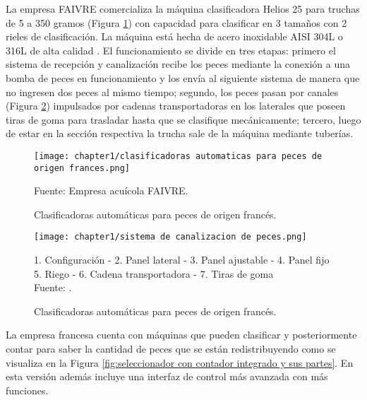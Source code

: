 La empresa FAIVRE comercializa la máquina clasificadora Helios 25 para truchas de 5 a 350 gramos (Figura \ref{fig:clasificadoras automaticas para peces de origen frances}) con capacidad para clasificar en 3 tamaños con 2 rieles de clasificación. La máquina está hecha de acero inoxidable AISI 304L o 316L de alta calidad \citep[p.~1]{FAIVRE2019a}. El funcionamiento se divide en tres etapas: primero el sistema de recepción y canalización recibe los peces mediante la conexión a una bomba de peces en funcionamiento y los envía al siguiente sistema de manera que no ingresen dos peces al mismo tiempo; segundo, los peces pasan por canales (Figura \ref{fig:sistema de canalizacion de peces}) impulsados por cadenas transportadoras en los laterales que poseen tiras de goma para trasladar hasta que se clasifique mecánicamente; tercero, luego de estar en la sección respectiva la trucha sale de la máquina mediante tuberías.

\begin{figure}[H]
	\centering
	\texttt{[image: chapter1/clasificadoras automaticas para peces de origen frances.png]}
	\caption{Clasificadoras automáticas para peces de origen francés.}
	\begin{myflushleftportland}		
		Fuente: Empresa acuícola FAIVRE.
	\end{myflushleftportland}
	\label{fig:clasificadoras automaticas para peces de origen frances}
\end{figure}

\begin{figure}[H]
	\centering
	\texttt{[image: chapter1/sistema de canalizacion de peces.png]}
	\caption{Clasificadoras automáticas para peces de origen francés.}
	\begin{myflushleftportland}		
		1. Configuración - 2. Panel lateral - 3. Panel ajustable - 4. Panel fijo \\
		5. Riego - 6. Cadena transportadora - 7. Tiras de goma\\
		Fuente: \citep{FAIVRE2018}.
	\end{myflushleftportland}	
	\label{fig:sistema de canalizacion de peces}
\end{figure}

La empresa francesa cuenta con máquinas que pueden clasificar y posteriormente contar para saber la cantidad de peces que se están redistribuyendo como se visualiza en la Figura \ref{fig:seleccionador con contador integrado y sus partes}. En esta versión además incluye una interfaz de control más avanzada con más funciones.

